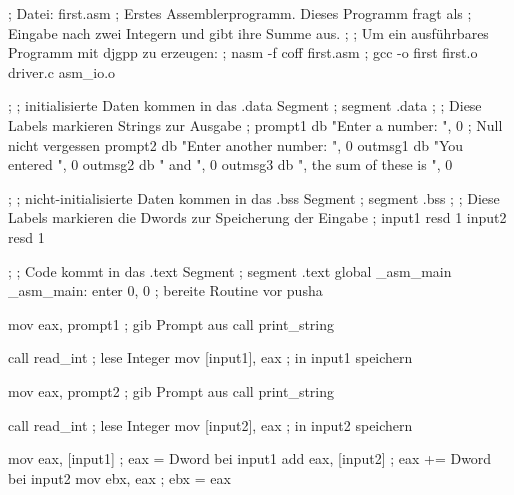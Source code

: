 \begin{AsmCodeListing}[label=first.asm, numbers=left, commandchars=\\\{\}]
 ; Datei: first.asm                                                 \label{line:first.asm0}
 ; Erstes Assemblerprogramm. Dieses Programm fragt als
 ; Eingabe nach zwei Integern und gibt ihre Summe aus.
 ;
 ; Um ein ausf\"{u}hrbares Programm mit djgpp zu erzeugen:
 ; nasm -f coff first.asm
 ; gcc -o first first.o driver.c asm_io.o

 ;
 ; initialisierte Daten kommen in das .data Segment
 ;
 segment .data                                                      \label{line:first.asm1}
 ;
 ; Diese Labels markieren Strings zur Ausgabe
 ;
 prompt1 db    "Enter a number: ", 0 ; Null nicht vergessen         \label{line:first.asm2}
 prompt2 db    "Enter another number: ", 0                          \label{line:first.asm2a}
 outmsg1 db    "You entered ", 0
 outmsg2 db    " and ", 0
 outmsg3 db    ", the sum of these is ", 0                          \label{line:first.asm3}

 ;
 ; nicht-initialisierte Daten kommen in das .bss Segment
 ;
 segment .bss                                                       \label{line:first.asm4}
 ;
 ; Diese Labels markieren die Dwords zur Speicherung der Eingabe
 ;
 input1  resd 1
 input2  resd 1

 ;
 ; Code kommt in das .text Segment
 ;
 segment .text                                                      \label{line:first.asm4a}
         global  _asm_main                                          \label{line:first.asm5}
 _asm_main:                                                         \label{line:first.asm6}
         enter   0, 0              ; bereite Routine vor
         pusha

         mov     eax, prompt1      ; gib Prompt aus
         call    print_string

         call    read_int          ; lese Integer
         mov     [input1], eax     ; in input1 speichern

         mov     eax, prompt2      ; gib Prompt aus
         call    print_string

         call    read_int          ; lese Integer
         mov     [input2], eax     ; in input2 speichern

         mov     eax, [input1]     ; eax = Dword bei input1         \label{line:first.asm7a}
         add     eax, [input2]     ; eax += Dword bei input2
         mov     ebx, eax          ; ebx = eax                      \label{line:first.asm7b}


\end{AsmCodeListing}
